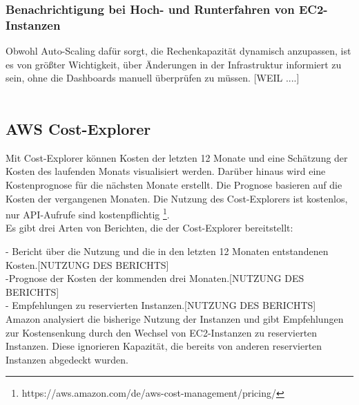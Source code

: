 \subsubsection{Benachrichtigung bei Hoch- und Runterfahren von EC2-Instanzen}
Obwohl Auto-Scaling dafür sorgt, die Rechenkapazität dynamisch anzupassen, ist es von größter Wichtigkeit, über Änderungen in der Infrastruktur informiert zu sein, ohne die Dashboards manuell überprüfen zu müssen.
[WEIL ....]
\\\\
\subsection{AWS Cost-Explorer}
Mit Cost-Explorer können Kosten der letzten 12 Monate und eine Schätzung der Kosten des laufenden Monats visualisiert werden. Darüber hinaus wird eine Kostenprognose für die nächsten Monate erstellt. Die Prognose basieren auf die Kosten der vergangenen Monaten. Die Nutzung des Cost-Explorers ist kostenlos, nur API-Aufrufe sind kostenpflichtig \footnote{https://aws.amazon.com/de/aws-cost-management/pricing/}.
\\
Es gibt drei Arten von Berichten, die der Cost-Explorer bereitstellt:

- Bericht über die Nutzung und die in den letzten 12 Monaten entstandenen Kosten.[NUTZUNG DES BERICHTS]\\
-Prognose der Kosten der kommenden drei Monaten.[NUTZUNG DES BERICHTS]\\
- Empfehlungen zu reservierten Instanzen.[NUTZUNG DES BERICHTS]\\
Amazon analysiert die bisherige Nutzung der Instanzen und gibt Empfehlungen zur Kostensenkung durch den Wechsel von EC2-Instanzen zu reservierten Instanzen. Diese ignorieren Kapazität, die bereits von anderen reservierten Instanzen abgedeckt wurden.
